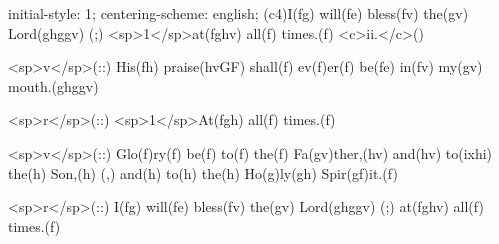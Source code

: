 initial-style: 1;
centering-scheme: english;
(c4)I(fg) will(fe) bless(fv) the(gv) Lord(ghggv) (;) <sp>1</sp>at(fghv) all(f) times.(f) <c>ii.</c>()

<sp>v</sp>(::) His(fh) praise(hvGF) shall(f) ev(f)er(f) be(fe) in(fv) my(gv) mouth.(ghggv)

<sp>r</sp>(::) <sp>1</sp>At(fgh) all(f) times.(f)

<sp>v</sp>(::) Glo(f)ry(f) be(f) to(f) the(f) Fa(gv)ther,(hv) and(hv) to(ixhi) the(h) Son,(h) (,) and(h) to(h) the(h) Ho(g)ly(gh) Spir(gf)it.(f)

<sp>r</sp>(::) I(fg) will(fe) bless(fv) the(gv) Lord(ghggv) (;) at(fghv) all(f) times.(f)